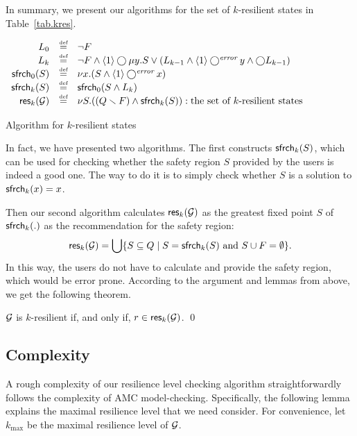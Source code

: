 In summary, we present our algorithms for the set of $k$-resilient states in 
Table~\ref{tab.kres}.  
\begin{table*}
\begin{center} 
$\begin{array}{rcl} 
L_0   & \stackrel{\mbox{\tiny def}}{=} 
& \neg F \\
L_k   & \stackrel{\mbox{\tiny def}}{=} 
& \neg F \wedge \langle 1 \rangle \bigcirc \mu y.S\vee(L_{k-1} \wedge \langle 1 \rangle \bigcirc^{\textit{\scriptsize error}} y \wedge \bigcirc L_{k-1})\\
\mathsf{sfrch}_0(S)	& \stackrel{\mbox{\tiny def}}{=} 
& \nu x.(S\wedge\langle 1\rangle \bigcirc^{\textit{\scriptsize error}} x)\\
\mathsf{sfrch}_k(S)	& \stackrel{\mbox{\tiny def}}{=} 
& \mathsf{sfrch}_0(S\wedge L_k)\\
\mathsf{res}_k({\cal G}) &\stackrel{\mbox{\tiny def}}{=} 
& \nu S. ((Q\smallsetminus F)\wedge\mathsf{sfrch}_k(S)): \mbox{the set of $k$-resilient states}\\
\end{array}$ 
\caption{Algorithm for $k$-resilient states} 
\label{tab.kres} 
\end{center} 
\end{table*} 
In fact, we have presented two algorithms. 
\label{reply2.2alg.sec} 
The first constructs $\mathsf{sfrch}_k(S)$, which can be used for checking whether the safety region $S$ 
provided by the users is indeed a good one. 
The way to do it is to simply check whether $S$ is a solution to $\mathsf{sfrch}_k(x)=x$. 


Then our second algorithm calculates $\mathsf{res}_k({\cal G})$ as the greatest fixed point $S$ of $\mathsf{sfrch}_k(.)$  
as the recommendation for the safety region:
$$ \mathsf{res}_k({\cal G}) = \bigcup \{S \subseteq Q \mid S = \mathsf{sfrch}_k(S) \mbox{ and } S\cup F = \emptyset\}.$$
In this way, the users do not have to calculate and provide the safety region, which would be error prone.
According to the argument and lemmas from above, 
we get the following theorem. 

\begin{theorem}
\label{theorem:main} 
${\cal G}$ is $k$-resilient if, and only if, $r\in \mathsf{res}_k({\cal G})$.  
\qed 
\end{theorem}
\subsection{Complexity}
A rough complexity of our resilience level checking algorithm 
straightforwardly follows the complexity of AMC model-checking.  
Specifically, the following lemma explains the maximal resilience level that we need consider. 
\label{reply2.maximal.k}
For convenience, let $k_{\max}$ be the maximal resilience level of ${\cal G}$.  

